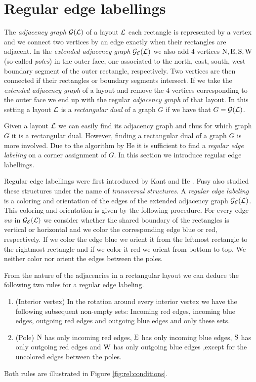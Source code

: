 
\section{Regular edge labellings}
\label{s:rel}
\thispagestyle{plain}
  The \emph{ adjacency graph} $\mathcal{G}(\mathcal{L})$ of a layout $\mathcal{L}$ each rectangle is represented by a vertex and we connect two vertices by an edge exactly when their rectangles are adjacent. In the \emph{extended adjacency graph} $\mathcal{G}_{\mathcal{E}}(\mathcal{L})$ we also add $4$ vertices $\mathrm{N}, \mathrm{E}, \mathrm{S}, \mathrm{W}$ (so-called \emph{poles}) in the outer face, one associated to the north, east, south, west boundary segment of the outer rectangle, respectively. Two vertices are then connected if their rectangles or boundary segments intersect.
  If we take the \emph{extended adjacency graph} of a layout and remove the $4$ vertices corresponding to the outer face we end up with the regular \emph{adjacency graph} of that layout.
  In this setting a layout $\mathcal{L}$ is a \emph{rectangular dual} of a graph $G$ if we have that $G = \mathcal{G}(\mathcal{L})$.



  Given a layout $\mathcal{L}$ we can easily find its adjacency graph and thus for which graph $G$ it is a rectangular dual. However, finding a rectangular dual of a graph $G$ is more involved. Due to the algorithm by He \cite{He1993} it is sufficient to find a \emph{regular edge labeling} on a corner assignment of $G$. In this section we introduce regular edge labellings.

  Regular edge labellings were first introduced by Kant and He \cite{Kant1997}.
  Fusy also studied these structures \cite{Fusy2009, Fusy2006} under the name of \emph{transversal structures}.
  A \emph{regular edge labeling} is a coloring and orientation of the edges of the extended adjacency graph $\mathcal{G}_{\mathcal{E}}(\mathcal{L})$.
  This coloring and orientation is given by the following procedure.
  For every edge $vw$ in $\mathcal{G}_{\mathcal{E}}(\mathcal{L})$ we consider whether the shared boundary of the rectangles is vertical or horizontal and we color the corresponding edge blue or red, respectively.
  If we color the edge blue we orient it from the leftmost rectangle to the rightmost rectangle and if we color it red we orient from bottom to top.
  We neither color nor orient the edges between the poles.

  From the nature of the adjacencies in a rectangular layout we can deduce the following two rules for a regular edge labeling.
  \begin{enumerate}
    \item (Interior vertex) In the rotation around every interior vertex we have the following subsequent non-empty sets: Incoming red edges, incoming blue edges, outgoing red edges and outgoing blue edges and only these sets.
    \item (Pole) $\mathrm{N}$ has only incoming red edges, $\mathrm{E}$ has only incoming blue edges, $\mathrm{S}$ has only outgoing red edges and $\mathrm{W}$ has only outgoing blue edges ,except for the uncolored edges between the poles.
  \end{enumerate}
  Both rules are illustrated in Figure \ref{fig:rel:conditions}.

